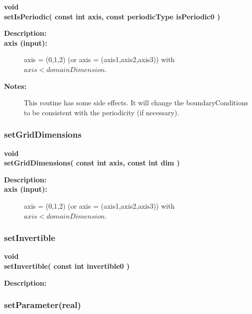 \begin{flushleft} \textbf{%
void  \\ 
\settowidth{\MappingIncludeArgIndent}{setIsPeriodic(}%
setIsPeriodic( const int axis, const periodicType isPeriodic0 )
}\end{flushleft}
\begin{description}
\item[{\bf Description:}] 
\item[{\bf axis (input):}]  axis = (0,1,2) (or axis = (axis1,axis2,axis3)) with $axis<domainDimension$.
\item[{\bf Notes:}] 
    This routine has some side effects. It will change the boundaryConditions to be consistent
  with the periodicity (if necessary).
\end{description}
\subsubsection{setGridDimensions}
 
\begin{flushleft} \textbf{%
void  \\ 
\settowidth{\MappingIncludeArgIndent}{setGridDimensions(}%
setGridDimensions( const int axis, const int dim )
}\end{flushleft}
\begin{description}
\item[{\bf Description:}] 
\item[{\bf axis (input):}]  axis = (0,1,2) (or axis = (axis1,axis2,axis3)) with $axis<domainDimension$.
\end{description}
\subsubsection{setInvertible}
 
\begin{flushleft} \textbf{%
void  \\ 
\settowidth{\MappingIncludeArgIndent}{setInvertible(}%
setInvertible( const int invertible0 )
}\end{flushleft}
\begin{description}
\item[{\bf Description:}] 
\end{description}
\subsubsection{setParameter(real)}
 
